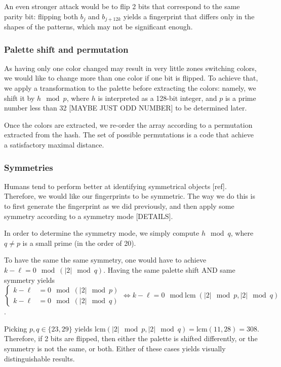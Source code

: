 \documentclass{article}
\begin{document}
An even stronger attack would be to flip 2 bits that correspond to the same parity bit: flipping both $b_j$ and $b_{j+12k}$ yields a fingerprint that differs only in the shapes of the patterns, which may not be significant enough.

\subsubsection{Palette shift and permutation}
As having only one color changed may result in very little zones switching colors, we would like to change more than one color if one bit is flipped. To achieve that, we apply a transformation to the palette before extracting the colors: namely, we shift it by $h \mod p$, where $h$ is interpreted as a 128-bit integer, and $p$ is a prime number less than 32 [MAYBE JUST ODD NUMBER] to be determined later. 

Once the colors are extracted, we re-order the array according to a permutation extracted from the hash. The set of possible permutations is a code that achieve a satisfactory maximal distance.


\subsubsection{Symmetries}
Humans tend to perform better at identifying symmetrical objects [ref]. Therefore, we would like our fingerprints to be symmetric. The way we do this is to first generate the fingerprint as we did previously, and then apply some symmetry according to a symmetry mode [DETAILS].

In order to determine the symmetry mode, we simply compute $h \mod q$, where $q \neq p$ is a small prime (in the order of 20). 

To have the same the same symmetry, one would have to achieve $k - \ell = 0\mod (|2| \mod q)$. Having the same palette shift AND same symmetry yields
$$\begin{cases}
k - \ell &= 0 \mod (|2| \mod p)\\
k - \ell &= 0 \mod (|2| \mod q)
\end{cases} \iff k - \ell = 0 \mod \text{lcm}(|2| \mod p, |2| \mod q)$$.

Picking $p, q \in \{23, 29\}$ yields $\text{lcm}(|2| \mod p, |2| \mod q) = \text{lcm}(11, 28) = 308$. Therefore, if 2 bits are flipped, then either the palette is shifted differently, or the symmetry is not the same, or both. Either of these cases yields visually distinguishable results.
\end{document}
